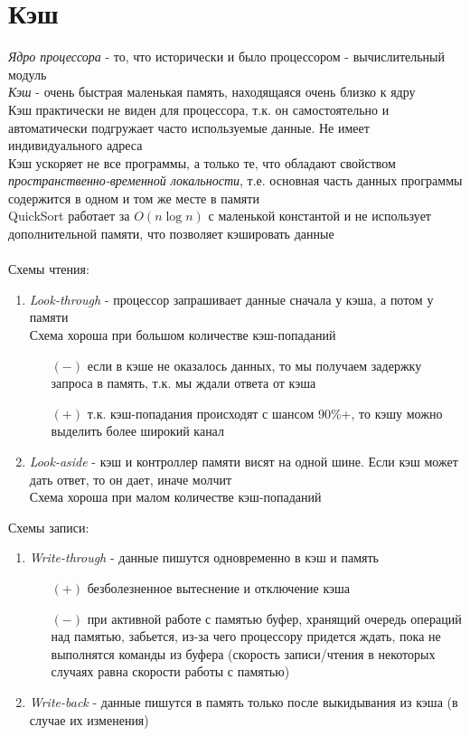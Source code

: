 \documentclass[12pt]{article}
\begin{document}
\section{Кэш}
\textit{Ядро процессора} - то, что исторически и было процессором - вычислительный модуль\\
\textit{Кэш} - очень быстрая маленькая память, находящаяся очень близко к ядру\\
Кэш практически не виден для процессора, т.к. он самостоятельно и автоматически подгружает часто используемые данные. Не имеет индивидуального адреса\\
Кэш ускоряет не все программы, а только те, что обладают свойством \textit{пространственно-временной локальности}, т.е. основная часть данных программы содержится в одном и том же месте в памяти\\
QuickSort работает за $O(n\log n)$ с маленькой константой и не использует дополнительной памяти, что позволяет кэшировать данные\\\\
Схемы чтения:
\begin{enumerate}
    \item \textit{Look-through} - процессор запрашивает данные сначала у кэша, а потом у памяти\\
    Схема хороша при большом количестве кэш-попаданий
    \begin{itemize}
        \item[$(-)$] если в кэше не оказалось данных, то мы получаем задержку запроса в память, т.к. мы ждали ответа от кэша
        \item[$(+)$] т.к. кэш-попадания происходят с шансом 90\%+, то кэшу можно выделить более широкий канал
    \end{itemize}
    \item \textit{Look-aside} - кэш и контроллер памяти висят на одной шине. Если кэш может дать ответ, то он дает, иначе молчит\\
    Схема хороша при малом количестве кэш-попаданий
\end{enumerate}
Схемы записи:
\begin{enumerate}
    \item \textit{Write-through} - данные пишутся одновременно в кэш и память
    \begin{itemize}
        \item[$(+)$] безболезненное вытеснение и отключение кэша
        \item[$(-)$] при активной работе с памятью буфер, хранящий очередь операций над памятью, забьется, из-за чего процессору придется ждать, пока не выполнятся команды из буфера (скорость записи/чтения в некоторых случаях равна скорости работы с памятью) 
    \end{itemize}
    \item \textit{Write-back} - данные пишутся в память только после выкидывания из кэша (в случае их изменения)
\end{enumerate}
\end{document}
